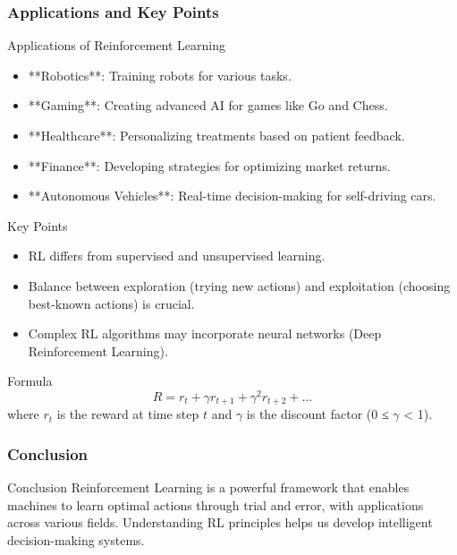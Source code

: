 \documentclass[aspectratio=169]{beamer}
\begin{document}
\begin{frame}[fragile]
    \frametitle{Applications and Key Points}

    \begin{block}{Applications of Reinforcement Learning}
        \begin{itemize}
            \item **Robotics**: Training robots for various tasks.
            \item **Gaming**: Creating advanced AI for games like Go and Chess.
            \item **Healthcare**: Personalizing treatments based on patient feedback.
            \item **Finance**: Developing strategies for optimizing market returns.
            \item **Autonomous Vehicles**: Real-time decision-making for self-driving cars.
        \end{itemize}
    \end{block}

    \begin{block}{Key Points}
        \begin{itemize}
            \item RL differs from supervised and unsupervised learning.
            \item Balance between exploration (trying new actions) and exploitation (choosing best-known actions) is crucial.
            \item Complex RL algorithms may incorporate neural networks (Deep Reinforcement Learning).
        \end{itemize}
    \end{block}
    
    \begin{block}{Formula}
        \begin{equation}
            R = r_t + \gamma r_{t+1} + \gamma^2 r_{t+2} + \ldots
        \end{equation}
        where \( r_t \) is the reward at time step \( t \) and \( \gamma \) is 
        the discount factor (0 ≤ $\gamma$ < 1).
    \end{block}
\end{frame}

\begin{frame}[fragile]
    \frametitle{Conclusion}

    \begin{block}{Conclusion}
        Reinforcement Learning is a powerful framework that enables machines 
        to learn optimal actions through trial and error, with applications across various fields. 
        Understanding RL principles helps us develop intelligent decision-making systems.
    \end{block}
\end{frame}
\end{document}
